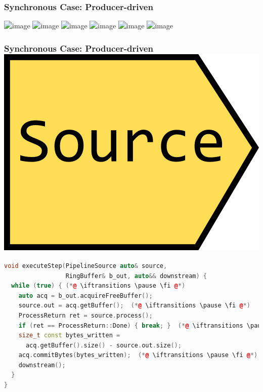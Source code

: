 \documentclass[aspectratio=169]{beamer}
\newif\iftransitions
\begin{document}
\begin{frame}[fragile]
  \frametitle{Synchronous Case: Producer-driven}
  
  \begin{center}
\includegraphics<1>[width=.95\textwidth]{pipelinesgfx/pipe_pd_010.png}
\includegraphics<2>[width=.95\textwidth]{pipelinesgfx/pipe_pd_020.png}
\includegraphics<3>[width=.95\textwidth]{pipelinesgfx/pipe_pd_025.png}
\includegraphics<4>[width=.95\textwidth]{pipelinesgfx/pipe_pd_030.png}
\includegraphics<5>[width=.95\textwidth]{pipelinesgfx/pipe_pd_035.png}
\includegraphics<6>[width=.95\textwidth]{pipelinesgfx/pipe_pd_040.png}
  \end{center}

\end{frame}

\begin{frame}[fragile]
  \frametitle{Synchronous Case: Producer-driven \hspace{180pt} \includegraphics[height=.1\textheight]{pipelinesgfx/source.png}}

  \begin{lstlisting}[language={C++}]
void executeStep(PipelineSource auto& source,
                 RingBuffer& b_out, auto&& downstream) {  
  while (true) { (*@ \iftransitions \pause \fi @*)
    auto acq = b_out.acquireFreeBuffer();
    source.out = acq.getBuffer();  (*@ \iftransitions \pause \fi @*)
    ProcessReturn ret = source.process();
    if (ret == ProcessReturn::Done) { break; }  (*@ \iftransitions \pause \fi @*)
    size_t const bytes_written =
      acq.getBuffer().size() - source.out.size();
    acq.commitBytes(bytes_written);  (*@ \iftransitions \pause \fi @*)
    downstream();
  }
}
  \end{lstlisting}
\end{frame}
\end{document}
